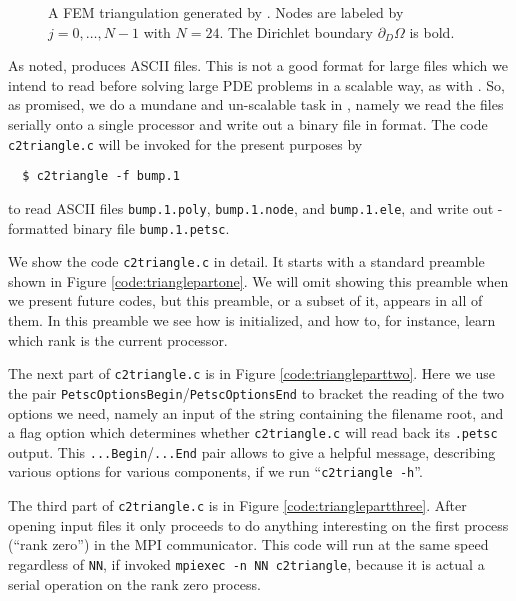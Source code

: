 \begin{figure*}

\caption{A FEM triangulation generated by \Triangle.  Nodes are labeled by $j=0,\dots,N-1$ with $N=24$.  The Dirichlet boundary $\partial_D \Omega$ is bold.}
\label{fig:triangulation}
\end{figure*}

As noted, \Triangle produces ASCII files.  This is not a good format for large files which we intend to read before solving large PDE problems in a scalable way, as with \PETSc.  So, as promised, we do a mundane and un-scalable task in \PETSc, namely we read the \Triangle files serially onto a single processor and write out a binary file in \PETSc format.  The code \texttt{c2triangle.c} will be invoked for the present purposes by
\begin{verbatim}
  $ c2triangle -f bump.1
\end{verbatim}
to read ASCII files \texttt{bump.1.poly}, \texttt{bump.1.node}, and  \texttt{bump.1.ele}, and write out \PETSc-formatted binary file \texttt{bump.1.petsc}.

We show the code \texttt{c2triangle.c} in detail.  It starts with a standard preamble shown in Figure  \ref{code:trianglepartone}.  We will omit showing this preamble when we present future codes, but this preamble, or a subset of it, appears in all of them. In this preamble we see how \PETSc is initialized, and how to, for instance, learn which rank is the current processor.


The next part of \texttt{c2triangle.c} is in Figure \ref{code:triangleparttwo}.  Here we use the pair \texttt{PetscOptionsBegin}/\texttt{PetscOptionsEnd} to bracket the reading of the two options we need, namely an input of the string containing the filename root, and a flag option which determines whether \texttt{c2triangle.c} will read back its \texttt{.petsc} output.  This \texttt{...Begin}/\texttt{...End} pair allows \PETSc to give a helpful message, describing various options for various components, if we run ``\texttt{c2triangle -h}''.


The third part of \texttt{c2triangle.c} is in Figure \ref{code:trianglepartthree}.  After opening input files it only proceeds to do anything interesting on the first process (``rank zero'') in the MPI communicator.  This code will run at the same speed regardless of \texttt{NN}, if invoked \texttt{mpiexec -n NN c2triangle}, because it is actual a serial operation on the rank zero process.

